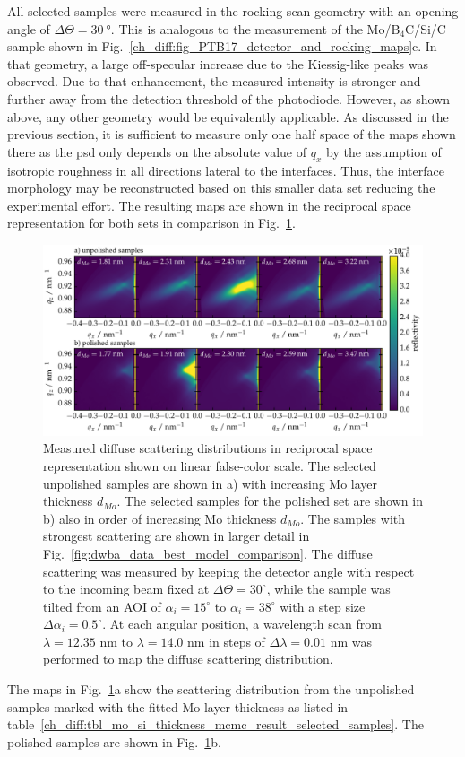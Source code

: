 All selected samples were measured in the rocking scan geometry with an opening angle of $\Delta \Theta = \SI{30}{\degree}$. This is analogous to the measurement of the Mo/B$_4$C/Si/C sample shown in Fig.~\ref{ch_diff:fig_PTB17_detector_and_rocking_maps}c. In that geometry, a large off-specular increase due to the Kiessig-like peaks was observed. Due to that enhancement, the measured intensity is stronger and further away from the detection threshold of the photodiode. However, as shown above, any other geometry would be equivalently applicable. As discussed in the previous section, it is sufficient to measure only one half space of the maps shown there as the \gls{psd} only depends on the absolute value of $q_x$ by the assumption of isotropic roughness in all directions lateral to the interfaces. Thus, the interface morphology may be reconstructed based on this smaller data set reducing the experimental effort. The resulting maps are shown in the reciprocal space representation for both sets in comparison in Fig.~\ref{ch_diff:fig_mo_si_c_diffuse}.
\begin{figure}[htbp]
\centering
\includegraphics[width=\textwidth]{img/MoSiC_diffuse_measurements}
\caption[Measured diffuse scattering distributions of the Mo/Si/C samples.]{Measured diffuse scattering distributions in reciprocal space representation shown on linear false-color scale. The selected unpolished samples are shown in a) with increasing Mo layer thickness $d_{Mo}$. The selected samples for the polished set are shown in b) also in order of increasing Mo thickness $d_{Mo}$. The samples with strongest scattering are shown in larger detail in Fig.~\ref{fig:dwba_data_best_model_comparison}. The diffuse scattering was measured by keeping the detector angle with respect to the incoming beam fixed at $\Delta\Theta = 30^\circ$, while the sample was tilted from an AOI of $\alpha_i=15^\circ$ to $\alpha_i=38^\circ$ with a step size $\Delta\alpha_i = 0.5^\circ$. At each angular position, a wavelength scan from $\lambda=12.35$ nm to $\lambda=14.0$ nm in steps of $\Delta\lambda = 0.01$ nm was performed to map the diffuse scattering distribution.}
\label{ch_diff:fig_mo_si_c_diffuse}
\end{figure}
The maps in Fig.~\ref{ch_diff:fig_mo_si_c_diffuse}a show the scattering distribution from the unpolished samples marked with the fitted Mo layer thickness as listed in table~\ref{ch_diff:tbl_mo_si_thickness_mcmc_result_selected_samples}. The polished samples are shown in Fig.~\ref{ch_diff:fig_mo_si_c_diffuse}b.

